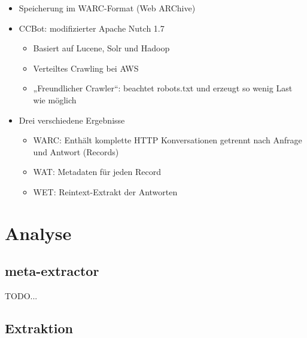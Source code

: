 \documentclass[a4paper,12pt,titlepage=false]{scrreprt}
\begin{document}
\begin{itemize}
    \item Speicherung im WARC-Format (Web ARChive)
    \item CCBot: modifizierter Apache Nutch 1.7
        \begin{itemize}
            \item Basiert auf Lucene, Solr und Hadoop
            \item Verteiltes Crawling bei AWS
            \item „Freundlicher Crawler“: beachtet robots.txt und erzeugt so wenig Last wie möglich
        \end{itemize}
    \item Drei verschiedene Ergebnisse
        \begin{itemize}
            \item WARC: Enthält komplette HTTP Konversationen getrennt nach
                Anfrage und Antwort (Records)
            \item WAT: Metadaten für jeden Record
            \item WET: Reintext-Extrakt der Antworten
        \end{itemize}
\end{itemize}


\chapter{Analyse}

\section{meta-extractor}

TODO...

\section{Extraktion}
\begin{center}
\end{center}
\end{document}
